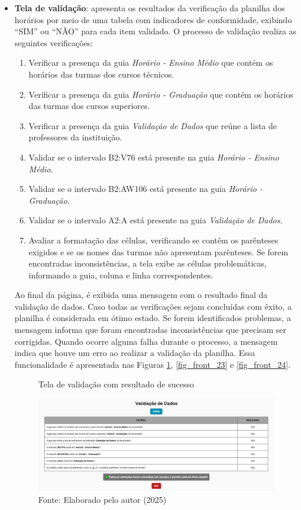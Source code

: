 \begin{itemize}
    \item \textbf{Tela de validação}: apresenta os resultados da verificação da planilha dos horários por meio de uma tabela com indicadores de conformidade, exibindo ``SIM'' ou ``NÃO'' para cada item validado. O processo de validação realiza as seguintes verificações:
    \begin{enumerate}
        \item Verificar a presença da guia \textit{Horário - Ensino Médio} que contém os horários das turmas dos cursos técnicos.
        \item Verificar a presença da guia \textit{Horário - Graduação} que contém os horários das turmas dos cursos superiores.
        \item Verificar a presença da guia \textit{Validação de Dados} que reúne a lista de professores da instituição.
        \item Validar se o intervalo B2:V76 está presente na guia \textit{Horário - Ensino Médio}.
        \item Validar se o intervalo B2:AW106 está presente na guia \textit{Horário - Graduação}.
        \item Validar se o intervalo A2:A está presente na guia \textit{Validação de Dados}.
        \item Avaliar a formatação das células, verificando se contêm os parênteses exigidos e se os nomes das turmas não apresentam parênteses. Se forem encontradas inconsistências, a tela exibe as células problemáticas, informando a guia, coluna e linha correspondentes.
    \end{enumerate}

    Ao final da página, é exibida uma mensagem com o resultado final da validação de dados. Caso todas as verificações sejam concluídas com êxito, a planilha é considerada em ótimo estado. Se forem identificados problemas, a mensagem informa que foram encontradas inconsistências que precisam ser corrigidas. Quando ocorre alguma falha durante o processo, a mensagem indica que houve um erro ao realizar a validação da planilha. Essa funcionalidade é apresentada nas Figuras \ref{fig_front_22}, \ref{fig_front_23} e \ref{fig_front_24}.

    \begin{figure}[htb]
        \centering 
        \caption{Tela de validação com resultado de sucesso}
        \includegraphics[width=1\textwidth]{Figuras/front-22.png}
        \caption*{Fonte: Elaborado pelo autor (2025)}
        \label{fig_front_22}
    \end{figure}


\end{itemize}
